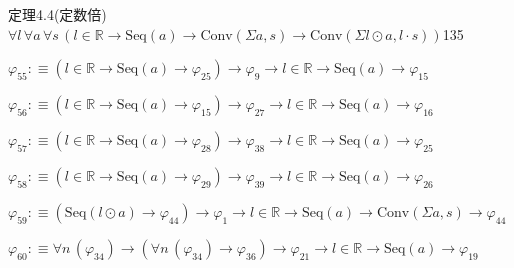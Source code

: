 \begin{fullproof}{定理4.4(定数倍)}{$\forall l\,\forall a\,\forall s\,(l \in \mathbb{R} \to \mathrm{Seq}(a) \to \mathrm{Conv}(\Sigma a,s) \to \mathrm{Conv}(\Sigma l \odot a,l \cdot s))$}{135}
\begin{abbrevlist}
\item $\varphi_{55} :\equiv (l \in \mathbb{R} \to \mathrm{Seq}(a) \to \varphi_{25}) \to \varphi_{9} \to l \in \mathbb{R} \to \mathrm{Seq}(a) \to \varphi_{15}$
\item $\varphi_{56} :\equiv (l \in \mathbb{R} \to \mathrm{Seq}(a) \to \varphi_{15}) \to \varphi_{27} \to l \in \mathbb{R} \to \mathrm{Seq}(a) \to \varphi_{16}$
\item $\varphi_{57} :\equiv (l \in \mathbb{R} \to \mathrm{Seq}(a) \to \varphi_{28}) \to \varphi_{38} \to l \in \mathbb{R} \to \mathrm{Seq}(a) \to \varphi_{25}$
\item $\varphi_{58} :\equiv (l \in \mathbb{R} \to \mathrm{Seq}(a) \to \varphi_{29}) \to \varphi_{39} \to l \in \mathbb{R} \to \mathrm{Seq}(a) \to \varphi_{26}$
\item $\varphi_{59} :\equiv (\mathrm{Seq}(l \odot a) \to \varphi_{44}) \to \varphi_{1} \to l \in \mathbb{R} \to \mathrm{Seq}(a) \to \mathrm{Conv}(\Sigma a,s) \to \varphi_{44}$
\item $\varphi_{60} :\equiv \forall n\,(\varphi_{34}) \to (\forall n\,(\varphi_{34}) \to \varphi_{36}) \to \varphi_{21} \to l \in \mathbb{R} \to \mathrm{Seq}(a) \to \varphi_{19}$
\end{abbrevlist}
\end{fullproof}
